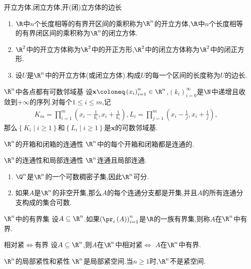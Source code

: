\begin{definition}{开立方体,闭立方体,开(闭)立方体的边长}{}
	\begin{enumerate}
		\item $\R$中$n$个长度相等的有界开区间的乘积称为$\R^{n}$的开立方体,$\R$中$n$个长度相等的有界闭区间的乘积称为$\R^{n}$的闭立方体.
		\item $\R^{2}$中的开立方体称为$\R^{2}$中的开正方形,$\R^{2}$中的闭立方体称为$\R^{2}$中的闭正方形.
		\item 设$U$是$\R^{n}$中的开立方体(或闭立方体).构成$U$的每一个区间的长度称为$U$的边长.
	\end{enumerate}
\end{definition}

\begin{proposition}{$\R^{n}$中各点都有可数邻域基}{}
	设$\mathbf{x}\coloneq\left(x_{i}\right)_{i=1}^{n}\in\R^{n}$,$\left(k_{i}\right)_{i=0}^{\infty}$是$\N$中递增且收敛到$+\infty$的序列.对每个$1\leq i\leq m$,记
	\begin{align*}
		K_{m}=\prod\limits_{i=1}^{m}\left(x_{i}-\frac{1}{k_{i}},x_{i}+\frac{1}{k_{i}}\right),L_{i}=\prod\limits_{j=1}^{m}\left(x_{i}-\frac{1}{j},x_{i}+\frac{1}{j}\right),
	\end{align*}
	那么$\left\{K_{i}\middle|i\geq 1\right\}$和$\left\{L_{i}\middle|i\geq 1\right\}$是$\mathbf{x}$的可数邻域基.
\end{proposition}

\begin{proposition}{$\R^{n}$的开箱和闭箱的连通性}{}
	$\R^{n}$中的每个开箱和闭箱都是连通的.
\end{proposition}

\begin{corollary}{$\R^{n}$的连通性和局部连通性}{}
	$\R^{n}$连通且局部连通.
\end{corollary}

\begin{remark}{}{}
	\begin{enumerate}
		\item $\Q^{n}$是$\R^{n}$的一个可数稠密子集,因此$\R^{n}$可分.
		\item 如果$A$是$\R^{n}$的非空开集,那么$A$的每个连通分支都是开集,并且$A$的所有连通分支构成的集合可数.
	\end{enumerate}
\end{remark}

\begin{definition}{$\R^{n}$中的有界集}{}
	设$A\subseteq\R^{n}$.如果$\left(\pr_{i}\left(A\right)\right)_{i=1}^{n}$是$\R$的一族有界集,则称$A$在$\R^{n}$中有界.
\end{definition}

\begin{proposition}{相对紧$\iff$有界}{}
	设$A\subseteq\R^{n}$,则$A$在$\R^{n}$中相对紧$\iff$ $A$在$\R^{n}$中有界.
\end{proposition}

\begin{corollary}{$\R^{n}$的局部紧性和紧性}{}
	$\R^{n}$是局部紧空间.当$n\geq 1$时,$\R^{n}$不是紧空间.
\end{corollary}